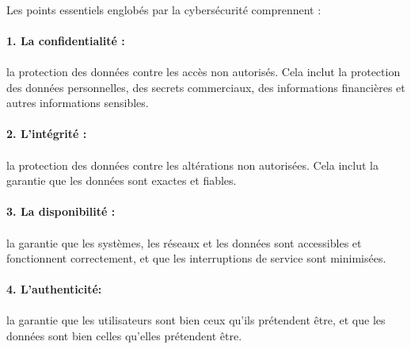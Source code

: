 \documentclass{report}
\begin{document}
  \paragraph{ }
  Les points essentiels englobés par la cybersécurité comprennent :
  \space \paragraph{ }


\paragraph{1. La confidentialité :}\paragraph{} la protection des données contre les accès non autorisés. Cela inclut la protection des données personnelles, des secrets commerciaux, des informations financières et autres informations sensibles.

\paragraph{2. L'intégrité :}\paragraph{} la protection des données contre les altérations non autorisées. Cela inclut la garantie que les données sont exactes et fiables.

\paragraph{3. La disponibilité :} \paragraph{}la garantie que les systèmes, les réseaux et les données sont accessibles et fonctionnent correctement, et que les interruptions de service sont minimisées.

\paragraph{4. L'authenticité:}  \paragraph{}la garantie que les utilisateurs sont bien ceux qu'ils prétendent être, et que les données sont bien celles qu'elles prétendent être.
\end{document}
